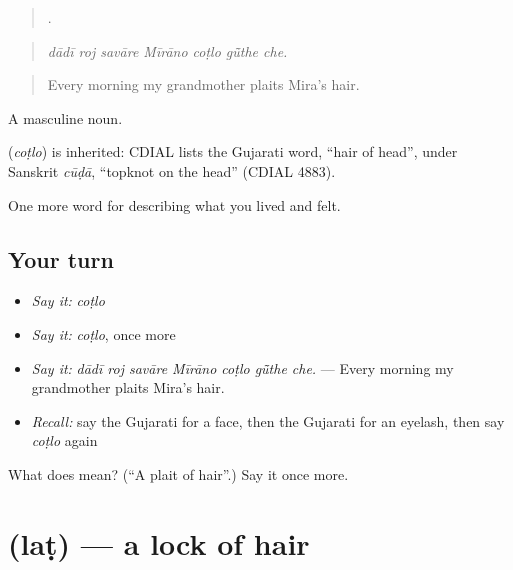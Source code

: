 \begin{quote}
      .
\end{quote}

\begin{quote}
\emph{dādī roj savāre Mīrāno coṭlo gū̃the che.}
\end{quote}

\begin{quote}
Every morning my grandmother plaits Mira's hair.
\end{quote}

A masculine noun.

\begin{cousinweb}
\textbf{} (\emph{coṭlo}) is inherited: CDIAL lists the Gujarati word, \textquotedblleft{}hair of head\textquotedblright{}, under Sanskrit \emph{cūḍā}, \textquotedblleft{}topknot on the head\textquotedblright{} (CDIAL 4883).
\end{cousinweb}

\begin{grammarlens}[title={What you've built}]
One more word for describing what you lived and felt.
\end{grammarlens}

\subsection*{Your turn}
\begin{itemize}
\raggedright
  \item \emph{Say it:} \emph{coṭlo}
  \item \emph{Say it:} \emph{coṭlo}, once more
  \item \emph{Say it:} \emph{dādī roj savāre Mīrāno coṭlo gū̃the che.} — Every morning my grandmother plaits Mira's hair.
  \item \emph{Recall:} say the Gujarati for a face, then the Gujarati for an eyelash, then say \emph{coṭlo} again
\end{itemize}

\begin{tcolorbox}[breakable,colback=teal!4,colframe=teal!35!black,title={Before you move on}]
What does  mean? (\textquotedblleft{}A plait of hair\textquotedblright{}.) Say it once more.
\end{tcolorbox}
\section[\texorpdfstring{\gu{લટ} (laṭ)}{લટ (laṭ)}]{ (laṭ) — a lock of hair}

